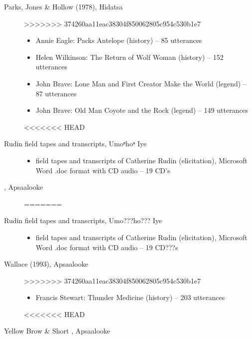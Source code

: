 \documentclass[output=paper]{LSP/langsci}
\begin{document}
\begin{description}

\item[Parks, Jones \& Hollow (1978), Hidatsa]\hfill
>>>>>>> 374260aa11eac38304f850062805c954c530b1e7
\begin{itemize}
\item Annie Eagle: Packs Antelope (history) -- 85 utterances
\item Helen Wilkinson: The Return of Wolf Woman (history) -- 152 utterances
\item John Brave: Lone Man and First Creator Make the World (legend) -- 87 utterances
\item John Brave: Old Man Coyote and the Rock (legend) -- 149 utterances
\end{itemize}

<<<<<<< HEAD
\item[Rudin field tapes and transcripts, Umoⁿhoⁿ Iye]\hfill
\begin{itemize}
\item field tapes and transcripts of Catherine Rudin (elicitation), Microsoft Word .doc format with CD audio -- 19 CD’s
\end{itemize}

\item[\citet{Wallace1993}, Apsaalooke]\hfill
=======
\item[Rudin field tapes and transcripts, Umo???ho??? Iye]\hfill
\begin{itemize}
\item field tapes and transcripts of Catherine Rudin (elicitation), Microsoft Word .doc format with CD audio -- 19 CD???s
\end{itemize}

\item[Wallace (1993), Apsaalooke]\hfill
>>>>>>> 374260aa11eac38304f850062805c954c530b1e7
\begin{itemize}
\item Francis Stewart: Thunder Medicine (history) -- 203 utterances
\end{itemize}

<<<<<<< HEAD
\item[Yellow Brow \& Short \citet{Bull1980}, Apsaalooke]\hfill
{}

\end{description}
\end{document}
